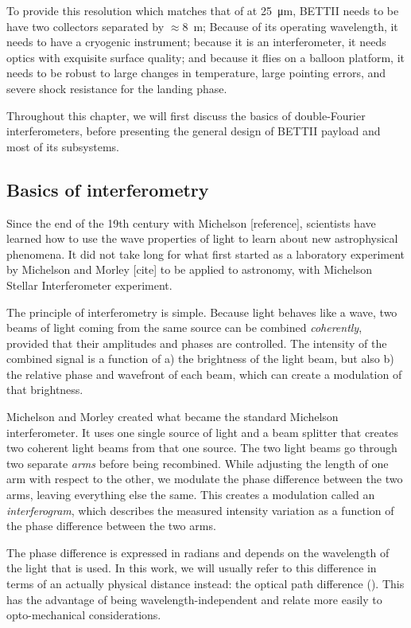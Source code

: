 To provide this resolution which matches that of \JWST at \SI{25}{\micro\meter}, BETTII needs to be have two collectors separated by $\approx$\SI{8}{\meter}; Because of its operating wavelength, it needs to have a cryogenic instrument; because it is an interferometer, it needs optics with exquisite surface quality; and because it flies on a balloon platform, it needs to be robust to large changes in temperature, large pointing errors, and severe shock resistance for the landing phase.

Throughout this chapter, we will first discuss the basics of double-Fourier interferometers, before presenting the general design of BETTII payload and most of its subsystems.


\subsection{Basics of interferometry}

Since the end of the 19th century with Michelson [reference], scientists have learned how to use the wave properties of light to learn about new astrophysical phenomena. It did not take long for what first started as a laboratory experiment by Michelson and Morley [cite] to be applied to astronomy, with Michelson Stellar Interferometer experiment. 

The principle of interferometry is simple. Because light behaves like a wave, two beams of light coming from the same source can be combined \textit{coherently}, provided that their amplitudes and phases are controlled. The intensity of the combined signal is a function of a) the brightness of the light beam, but also b) the relative phase and wavefront of each beam, which can create a modulation of that brightness.

Michelson and Morley created what became the standard Michelson interferometer. It uses one single source of light and a beam splitter that creates two coherent light beams from that one source. The two light beams go through two separate \textit{arms} before being recombined. While adjusting the length of one arm with respect to the other, we modulate the phase difference between the two arms, leaving everything else the same. This creates a modulation called an \textit{interferogram}, which describes the measured intensity variation as a function of the phase difference between the two arms.

The phase difference is expressed in radians and depends on the wavelength of the light that is used. In this work, we will usually refer to this difference in terms of an actually physical distance instead: the optical path difference (\OPD). This has the advantage of being wavelength-independent and relate more easily to opto-mechanical considerations.

